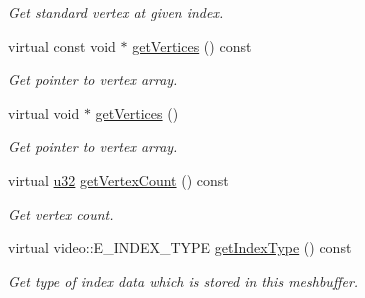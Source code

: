 \begin{DoxyCompactItemize}
\begin{DoxyCompactList}\small\item\em Get standard vertex at given index. \end{DoxyCompactList}\item 
\mbox{\label{structirr_1_1scene_1_1SSkinMeshBuffer_a61271053674a773fd4afcdffafddf9b3}} 
virtual const void $\ast$ \hyperlink{structirr_1_1scene_1_1SSkinMeshBuffer_a61271053674a773fd4afcdffafddf9b3}{get\+Vertices} () const
\begin{DoxyCompactList}\small\item\em Get pointer to vertex array. \end{DoxyCompactList}\item 
\mbox{\label{structirr_1_1scene_1_1SSkinMeshBuffer_af9671765c9d6be2b6d99878e1bdb1b9d}} 
virtual void $\ast$ \hyperlink{structirr_1_1scene_1_1SSkinMeshBuffer_af9671765c9d6be2b6d99878e1bdb1b9d}{get\+Vertices} ()
\begin{DoxyCompactList}\small\item\em Get pointer to vertex array. \end{DoxyCompactList}\item 
\mbox{\label{structirr_1_1scene_1_1SSkinMeshBuffer_a0420d14f4a4317192aa3423c0634d8d8}} 
virtual \hyperlink{namespaceirr_a0416a53257075833e7002efd0a18e804}{u32} \hyperlink{structirr_1_1scene_1_1SSkinMeshBuffer_a0420d14f4a4317192aa3423c0634d8d8}{get\+Vertex\+Count} () const
\begin{DoxyCompactList}\small\item\em Get vertex count. \end{DoxyCompactList}\item 
virtual video\+::\+E\+\_\+\+I\+N\+D\+E\+X\+\_\+\+T\+Y\+PE \hyperlink{structirr_1_1scene_1_1SSkinMeshBuffer_a0655e2196cb283a164580ada6c34aecf}{get\+Index\+Type} () const
\begin{DoxyCompactList}\small\item\em Get type of index data which is stored in this meshbuffer. \end{DoxyCompactList}\item 
\mbox{\label{structirr_1_1scene_1_1SSkinMeshBuffer_ac5f16b3fca6454afe01939a2c1e23d08}} 

\end{DoxyCompactItemize}
